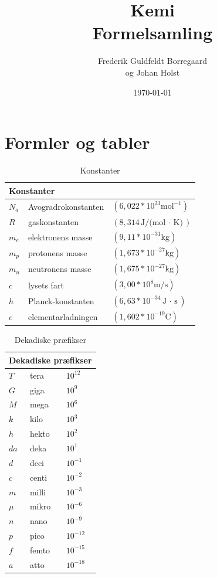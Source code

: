 \documentclass[a4paper, 11pt, twocolumn]{report}
\title{\Huge{Kemi}\\Formelsamling}
\author{
  \Large{Frederik Guldfeldt Borregaard}\\
  \Large{og Johan Holst}\\
  }
\date{\today}
\begin{document}
\maketitle
\newpage%
\onecolumn
\tableofcontents

\twocolumn
\pagebreak

\chapter{Formler og tabler}

\begin{table}[]
    \begin{tabular}{ l l l}
    \multicolumn{3}{l}{\textbf{Konstanter}} \\
        \hline  
        $N_a$ & Avogradrokonstanten & $( 6,022 * 10^{23} \text{mol}^{-1} )$ \\
        $R$ & gaskonstanten & $( 8,314 \text{J/(mol $\cdot$ K)} )$ \\
        $m_e$ & elektronens masse & $( 9,11 * 10^{-31} \text{kg} )$ \\
        $m_p$ & protonens masse & $( 1,673 * 10^{-27} \text{kg} )$ \\
        $m_n$ & neutronens masse & $( 1,675 * 10^{-27} \text{kg} )$ \\
        $c$ & lysets fart & $(3,00 *10^8 \text{m/s} )$ \\
        $h$ & Planck-konstanten & $( 6,63 * 10^{-34} \text{J $\cdot$ s} )$ \\
        $e$ & elementarladningen & $( 1,602 * 10^{-19} \text{C} )$ 
    \end{tabular}
    \caption{Konstanter}
\end{table}

\begin{table}[]
    \begin{tabular}{ l l l}
    \multicolumn{3}{l}{\textbf{Dekadiske præfikser}} \\
        \hline  
        $T$ & tera & $10^{12}$ \\
        $G$ & giga & $10^{9}$ \\
        $M$ & mega & $10^{6}$ \\
        $k$ & kilo & $10^{3}$ \\
        $h$ & hekto & $10^{2}$ \\
        $da$ & deka & $10^{1}$ \\
        $d$ & deci & $10^{-1}$ \\
        $c$ & centi & $10^{-2}$ \\
        $m$ & milli & $10^{-3}$ \\
        $\mu$ & mikro & $10^{-6}$ \\
        $n$ & nano & $10^{-9}$ \\
        $p$ & pico & $10^{-12}$ \\
        $f$ & femto & $10^{-15}$ \\
        $a$ & atto & $10^{-18}$ 
    \end{tabular}
    \caption{Dekadiske præfikser}
\end{table}
\end{document}
